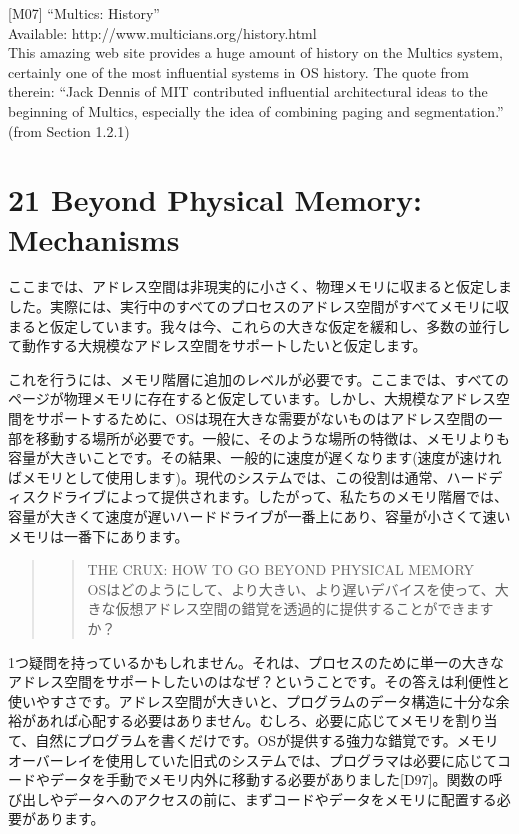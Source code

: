 {[}M07{]} ``Multics: History''\\
Available: http://www.multicians.org/history.html\\
This amazing web site provides a huge amount of history on the Multics
system, certainly one of the most influential systems in OS history. The
quote from therein: ``Jack Dennis of MIT contributed influential
architectural ideas to the beginning of Multics, especially the idea of
combining paging and segmentation.'' (from Section 1.2.1)

\newpage

\hypertarget{beyond-physical-memory-mechanisms}{%
\section*{21 Beyond Physical Memory:
Mechanisms}\label{beyond-physical-memory-mechanisms}}

ここまでは、アドレス空間は非現実的に小さく、物理メモリに収まると仮定しました。実際には、実行中のすべてのプロセスのアドレス空間がすべてメモリに収まると仮定しています。我々は今、これらの大きな仮定を緩和し、多数の並行して動作する大規模なアドレス空間をサポートしたいと仮定します。

これを行うには、メモリ階層に追加のレベルが必要です。ここまでは、すべてのページが物理メモリに存在すると仮定しています。しかし、大規模なアドレス空間をサポートするために、OSは現在大きな需要がないものはアドレス空間の一部を移動する場所が必要です。一般に、そのような場所の特徴は、メモリよりも容量が大きいことです。その結果、一般的に速度が遅くなります(速度が速ければメモリとして使用します)。現代のシステムでは、この役割は通常、ハードディスクドライブによって提供されます。したがって、私たちのメモリ階層では、容量が大きくて速度が遅いハードドライブが一番上にあり、容量が小さくて速いメモリは一番下にあります。

\begin{quote}
\begin{quote}
THE CRUX: HOW TO GO BEYOND PHYSICAL MEMORY\\
OSはどのようにして、より大きい、より遅いデバイスを使って、大きな仮想アドレス空間の錯覚を透過的に提供することができますか？
\end{quote}
\end{quote}

1つ疑問を持っているかもしれません。それは、プロセスのために単一の大きなアドレス空間をサポートしたいのはなぜ？ということです。その答えは利便性と使いやすさです。アドレス空間が大きいと、プログラムのデータ構造に十分な余裕があれば心配する必要はありません。むしろ、必要に応じてメモリを割り当て、自然にプログラムを書くだけです。OSが提供する強力な錯覚です。メモリオーバーレイを使用していた旧式のシステムでは、プログラマは必要に応じてコードやデータを手動でメモリ内外に移動する必要がありました{[}D97{]}。関数の呼び出しやデータへのアクセスの前に、まずコードやデータをメモリに配置する必要があります。

